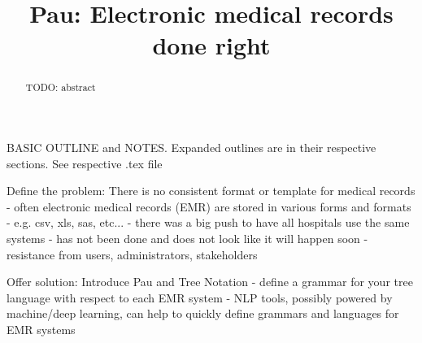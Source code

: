 \documentclass[journal]{IEEEtran}
\begin{document}
\title{Pau: Electronic medical records done right}

\iffalse
\author{
  Lambert Leong \\
  University of Hawaii \\
  {\underline{lambert3@hawaii.edu}} \\
\and
  Xun Zhu \\
  University of Hawaii \\
  {\underline{zhu2@hawaii.edu}} \\
\and
  Breck Yunits\\
  University of Hawaii Cancer Center\\
  {\underline{breckuh@gmail.com}}\\ }
\fi


\date{}

\maketitle
\begin{abstract}
	TODO: abstract
\end{abstract}

\iffalse
BASIC OUTLINE and NOTES. Expanded outlines are in their respective sections. See respective .tex file

Define the problem: There is no consistent format or template for medical records
	- often electronic medical records (EMR) are stored in various forms and
	  formats
		- e.g. csv, xls, sas, etc...
	- there was a big push to have all hospitals use the same systems
		- has not been done and does not look like it will happen soon
		- resistance from users, administrators, stakeholders

Offer solution: Introduce Pau and Tree Notation
	- define a grammar for your tree language with respect to each EMR system
	- NLP tools, possibly powered by machine/deep learning, can help to
	  quickly define grammars and languages for EMR systems
\end{document}
